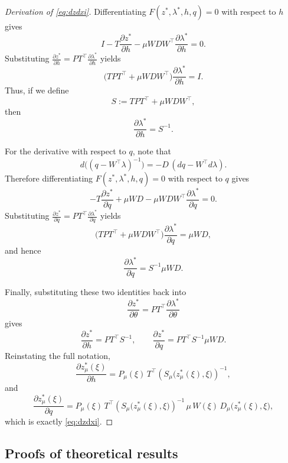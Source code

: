 \documentclass{article}
\theoremstyle{plain}
\theoremstyle{definition}
\theoremstyle{remark}
\begin{document}
\begin{proof}[Derivation of \eqref{eq:dzdxi}]
Differentiating $F(z^*,\lambda^*,h,q)=0$ with respect to $h$ gives
\[
I
-
T\frac{\partial z^*}{\partial h}
-
\mu WDW^\top\frac{\partial \lambda^*}{\partial h}
=0.
\]
Substituting $\frac{\partial z^*}{\partial h}=PT^\top\frac{\partial \lambda^*}{\partial h}$
yields
\[
\Big(TPT^\top+\mu WDW^\top\Big)\frac{\partial \lambda^*}{\partial h}=I.
\]
Thus, if we define
\[
S:=TPT^\top+\mu WDW^\top,
\]
then
\[
\frac{\partial \lambda^*}{\partial h}=S^{-1}.
\]

For the derivative with respect to $q$, note that
\[
d\big((q-W^\top\lambda)^{-1}\big)
=
-D\,(dq-W^\top d\lambda).
\]
Therefore differentiating $F(z^*,\lambda^*,h,q)=0$ with respect to $q$ gives
\[
-T\frac{\partial z^*}{\partial q}
+
\mu WD
-
\mu WDW^\top\frac{\partial \lambda^*}{\partial q}
=0.
\]
Substituting $\frac{\partial z^*}{\partial q}=PT^\top\frac{\partial \lambda^*}{\partial q}$
yields
\[
\Big(TPT^\top+\mu WDW^\top\Big)\frac{\partial \lambda^*}{\partial q}
=
\mu WD,
\]
and hence
\[
\frac{\partial \lambda^*}{\partial q}=S^{-1}\mu WD.
\]

Finally, substituting these two identities back into
\[
\frac{\partial z^*}{\partial \theta}
=
PT^\top\frac{\partial \lambda^*}{\partial \theta}
\]
gives
\[
\frac{\partial z^*}{\partial h}=PT^\top S^{-1},
\qquad
\frac{\partial z^*}{\partial q}=PT^\top S^{-1}\mu WD.
\]
Reinstating the full notation,
\[
\frac{\partial z_\mu^*(\xi)}{\partial h}
=
P_\mu(\xi)\,T^\top
\left(S_\mu\!\big(z_\mu^*(\xi),\xi\big)\right)^{-1},
\]
and
\[
\frac{\partial z_\mu^*(\xi)}{\partial q}
=
P_\mu(\xi)\,T^\top
\left(S_\mu\!\big(z_\mu^*(\xi),\xi\big)\right)^{-1}
\,\mu\,W(\xi)\,D_\mu\!\big(z_\mu^*(\xi),\xi\big),
\]
which is exactly \eqref{eq:dzdxi}.
\end{proof}

\subsection{Proofs of theoretical results}
\label{sec:appendix-proofs}
\end{document}
